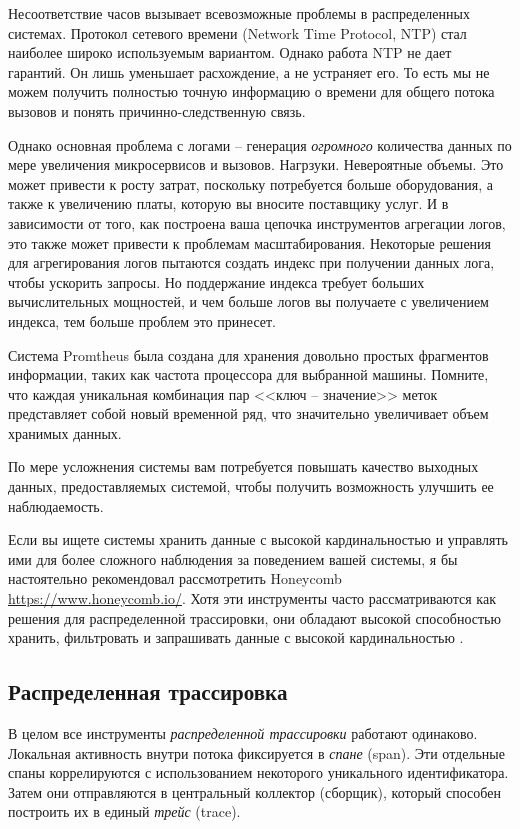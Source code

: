 \documentclass[%
	11pt,
	a4paper,
	utf8,
		]{article}
\begin{document}
Несоответствие часов вызывает всевозможные проблемы в распределенных системах. Протокол сетевого времени (Network Time Protocol, NTP) стал наиболее широко используемым вариантом. Однако работа NTP не дает гарантий. Он лишь уменьшает расхождение, а не устраняет его. То есть мы не можем получить полностью точную информацию о времени для общего потока вызовов и понять причинно-следственную связь.

Однако основная проблема с логами -- генерация \emph{огромного} количества данных по мере увеличения микросервисов и вызовов. Нагрзуки. Невероятные объемы. Это может привести к росту затрат, поскольку потребуется больше оборудования, а также к увеличению платы, которую вы вносите  поставщику услуг. И в зависимости от того, как построена ваша цепочка инструментов агрегации логов, это также может привести к проблемам масштабирования. Некоторые решения для агрегирования логов пытаются создать индекс при получении данных лога, чтобы ускорить запросы. Но поддержание индекса требует больших вычислительных мощностей, и чем больше логов вы получаете с увеличением индекса, тем больше проблем это принесет.

Система Promtheus была создана для хранения довольно простых фрагментов информации, таких как частота процессора для выбранной машины. Помните, что каждая уникальная комбинация пар <<ключ -- значение>> меток представляет собой новый временной ряд, что значительно увеличивает объем хранимых данных. 

По мере усложнения системы вам потребуется повышать качество выходных данных, предоставляемых системой, чтобы получить возможность улучшить ее наблюдаемость.

Если вы ищете системы хранить данные с высокой кардинальностью и управлять ими для более сложного наблюдения за поведением вашей системы, я бы настоятельно рекомендовал рассмотретить Honeycomb \url{https://www.honeycomb.io/}. Хотя эти инструменты часто рассматриваются как решения для распределенной трассировки, они обладают высокой способностью хранить, фильтровать и запрашивать данные с высокой кардинальностью \cite[]{microservices-2024}.

\subsection{Распределенная трассировка}

В целом все инструменты \emph{распределенной трассировки} работают одинаково. Локальная активность внутри потока фиксируется в \emph{спане} (span). Эти отдельные спаны коррелируются с использованием некоторого уникального идентификатора. Затем они отправляются в центральный коллектор (сборщик), который способен построить их в единый \emph{трейс} (trace). 
\end{document}
